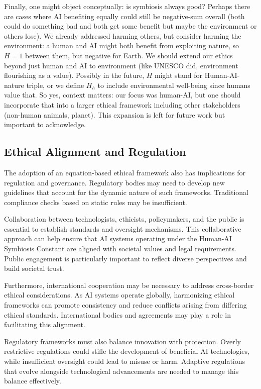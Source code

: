 \documentclass[12pt]{article}
\begin{document}
Finally, one might object conceptually: is symbiosis always good? Perhaps there are cases where AI benefiting equally could still be negative-sum overall (both could do something bad and both get some benefit but maybe the environment or others lose). We already addressed harming others, but consider harming the environment: a human and AI might both benefit from exploiting nature, so $H=1$ between them, but negative for Earth. We should extend our ethics beyond just human and AI to environment (like UNESCO did, environment flourishing as a value). Possibly in the future, $H$ might stand for Human-AI-nature triple, or we define $H_h$ to include environmental well-being since humans value that. So yes, context matters: our focus was human-AI, but one should incorporate that into a larger ethical framework including other stakeholders (non-human animals, planet). This expansion is left for future work but important to acknowledge.


\subsection{Ethical Alignment and Regulation}

The adoption of an equation-based ethical framework also has implications for regulation and governance. Regulatory bodies may need to develop new guidelines that account for the dynamic nature of such frameworks. Traditional compliance checks based on static rules may be insufficient.

Collaboration between technologists, ethicists, policymakers, and the public is essential to establish standards and oversight mechanisms. This collaborative approach can help ensure that AI systems operating under the Human-AI Symbiosis Constant are aligned with societal values and legal requirements. Public engagement is particularly important to reflect diverse perspectives and build societal trust.

Furthermore, international cooperation may be necessary to address cross-border ethical considerations. As AI systems operate globally, harmonizing ethical frameworks can promote consistency and reduce conflicts arising from differing ethical standards. International bodies and agreements may play a role in facilitating this alignment.

Regulatory frameworks must also balance innovation with protection. Overly restrictive regulations could stifle the development of beneficial AI technologies, while insufficient oversight could lead to misuse or harm. Adaptive regulations that evolve alongside technological advancements are needed to manage this balance effectively.
\end{document}
